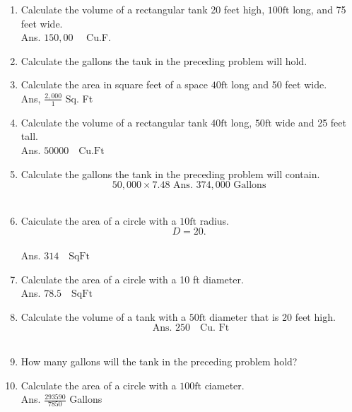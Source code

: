 \documentclass{article}
\begin{document}
\begin{enumerate}
\item Calculate the volume of a rectangular tank 20 feet high, $100 \mathrm{ft}$ long, and 75 feet wide.\\
Ans. $150,00 \quad$ Cu.F.\\

\item Calculate the gallons the tauk in the preceding problem will hold.\\

\item Calculate the area in square feet of a space $40 \mathrm{ft}$ long and 50 feet wide.\\
Ans, $\frac{2,000}{1}$ Sq. Ft\\

\item Calculate the volume of a rectangular tank $40 \mathrm{ft}$ long, $50 \mathrm{ft}$ wide and 25 feet tall.\\
Ans. $50000 \quad \mathrm{Cu} . \mathrm{Ft}$\\

\item Calculate the gallons the tank in the preceding problem will contain.\\
$$50,000 \times 7.48 \text { Ans. } 374,000 \text { Gallons }$$\\

\item Caiculate the area of a circle with a $10 \mathrm{ft}$ radius.\\
$$D=20 \text {. }$$\\
Ans. $314 \quad \mathrm{Sq} \mathrm{Ft}$\\

\item Calculate the area of a circle with a 10 ft diameter.\\
Ans. $78.5 \quad \mathrm{Sq} \mathrm{Ft}$\\

\item Calculate the volume of a tank with a $50 \mathrm{ft}$ diameter that is 20 feet high.\\
$$\text { Ans. } 250 \quad \mathrm{Cu} \text {. Ft }$$\\

\item How many gallons will the tank in the preceding problem hold?\\

\item Calculate the area of a circle with a $100 \mathrm{ft}$ ciameter.\\
Ans. $\frac{293590}{7850}$ Gallons\\


\end{enumerate}
\end{document}
